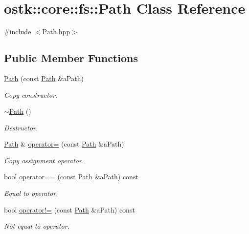 \hypertarget{classostk_1_1core_1_1fs_1_1_path}{}\section{ostk\+:\+:core\+:\+:fs\+:\+:Path Class Reference}
\label{classostk_1_1core_1_1fs_1_1_path}


{\ttfamily \#include $<$Path.\+hpp$>$}

\subsection*{Public Member Functions}
\begin{DoxyCompactItemize}
\item 
\hyperlink{classostk_1_1core_1_1fs_1_1_path_a1a5fff28594542489223b4cfad6cc9fb}{Path} (const \hyperlink{classostk_1_1core_1_1fs_1_1_path}{Path} \&a\+Path)
\begin{DoxyCompactList}\small\item\em Copy constructor. \end{DoxyCompactList}\item 
\hyperlink{classostk_1_1core_1_1fs_1_1_path_abd11b5b6a10d8129a94967cd3833033c}{$\sim$\+Path} ()
\begin{DoxyCompactList}\small\item\em Destructor. \end{DoxyCompactList}\item 
\hyperlink{classostk_1_1core_1_1fs_1_1_path}{Path} \& \hyperlink{classostk_1_1core_1_1fs_1_1_path_a6699145e4985cba5e183b0a4fb0527fd}{operator=} (const \hyperlink{classostk_1_1core_1_1fs_1_1_path}{Path} \&a\+Path)
\begin{DoxyCompactList}\small\item\em Copy assignment operator. \end{DoxyCompactList}\item 
bool \hyperlink{classostk_1_1core_1_1fs_1_1_path_ae45d6cca5419b3cb362e2924ed535d4f}{operator==} (const \hyperlink{classostk_1_1core_1_1fs_1_1_path}{Path} \&a\+Path) const
\begin{DoxyCompactList}\small\item\em Equal to operator. \end{DoxyCompactList}\item 
bool \hyperlink{classostk_1_1core_1_1fs_1_1_path_a9188fa1857fd43acb8409d6851564b47}{operator!=} (const \hyperlink{classostk_1_1core_1_1fs_1_1_path}{Path} \&a\+Path) const
\begin{DoxyCompactList}\small\item\em Not equal to operator. \end{DoxyCompactList}\item 

\end{DoxyCompactItemize}
